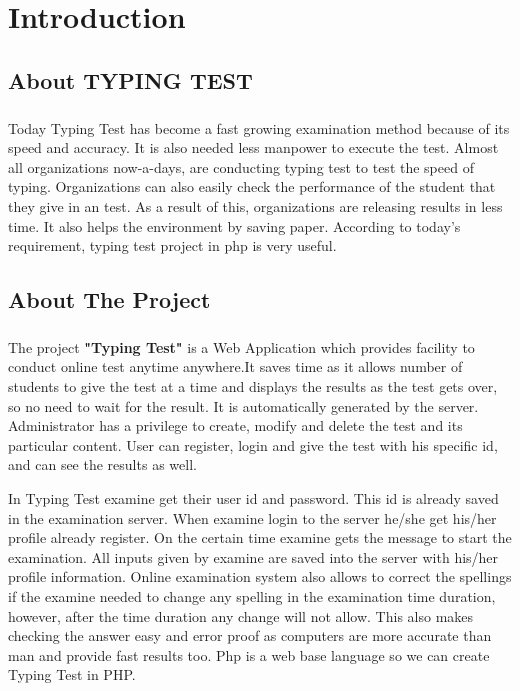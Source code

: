 \chapter{Introduction}
\section{
About TYPING TEST}
\large{ \paragraph{
}
Today Typing Test has become a fast growing examination method because of its speed and accuracy. It is also needed less manpower to execute the test. Almost all organizations now-a-days, are conducting typing test to test the speed of typing. Organizations can also easily check the performance of the student that they give in an test. As a result of this, organizations are releasing results in less time. It also helps the environment by saving paper.
According to today’s requirement, typing test project in php is very useful.
}

\section{About The Project}
 \large{\paragraph{}
  The project \textbf{"Typing Test"} is a Web Application which provides facility to conduct online test anytime anywhere.It saves time as it allows number of students to give the test at a 
time  and  displays  the  results  as  the  test  gets  over, so  no need  to wait for the result. It is automatically generated by the server. Administrator has a privilege to create, modify and delete the test and its particular content. User can register, login and give the test with his specific id, and can see the results as well.

In Typing Test examine get their user id and password. This id is already saved in the examination server. When examine login to the server he/she get his/her profile already register. On the certain time examine gets the message to start the examination. All inputs  given by examine are saved into the server with his/her profile information. Online examination system also allows to correct the spellings if the examine needed to change any spelling in the examination time duration, however, after the time duration any change will not allow. This also makes checking the answer easy and error proof as computers are more accurate than man and provide fast results too. Php is a web base language so we can create Typing Test in PHP.
 }
